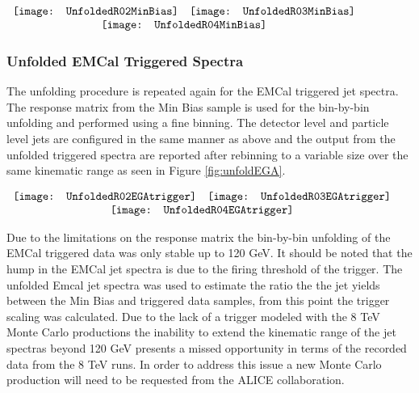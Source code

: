 \begin{figure*}[t!]
$\begin{array}{rl}
    \texttt{[image: UnfoldedR02MinBias]} &
    \texttt{[image: UnfoldedR03MinBias]}\\
    \multicolumn{2}{c}{\texttt{[image: UnfoldedR04MinBias]}}
\end{array}$
\caption[Corrected Jet Spectra to Monte Carlo level for R = 0.2, R=0.3, and R = 0.4 jets.]{\label{fig:unfoldMinbias}Unfolded Min Bias Jet Spectra with correction factors, $C_{MC}$, for R = 0.2, R=0.3, and R = 0.4 jets.}
\end{figure*}

\subsubsection{Unfolded EMCal Triggered Spectra}
The unfolding procedure is repeated again for the EMCal triggered jet spectra.  The response matrix from the Min Bias sample is used for the bin-by-bin unfolding and performed using a fine binning.  The detector level and particle level jets are configured in the same manner as above and the output from the unfolded triggered spectra are reported after rebinning to a variable size over the same kinematic range as seen in Figure \ref{fig:unfoldEGA}.

\begin{figure*}[t!]
$\begin{array}{rl}
    \texttt{[image: UnfoldedR02EGAtrigger]} &
    \texttt{[image: UnfoldedR03EGAtrigger]}\\
    \multicolumn{2}{c}{\texttt{[image: UnfoldedR04EGAtrigger]}}
\end{array}$
\caption[Corrected EMCal Triggered Jet Spectra to Monte Carlo level for R = 0.2, R=0.3, and R = 0.4 jets.]{\label{fig:unfoldEGA}Unfolded EMCal Triggered Jet Spectra with correction factors, $C_{MC}$, for R = 0.2, R=0.3, and R = 0.4 jets.}
\end{figure*}

\noindent
Due to the limitations on the response matrix the bin-by-bin unfolding of the EMCal triggered data was only stable up to 120 GeV.  It should be noted that the hump in the EMCal jet spectra is due to the firing threshold of the trigger.  The unfolded Emcal jet spectra was used to estimate the ratio the the jet yields between the Min Bias and triggered data samples, from this point the trigger scaling was calculated.  Due to the lack of a trigger modeled with the 8 TeV Monte Carlo productions the inability to extend the kinematic range of the jet spectras beyond 120 GeV presents a missed opportunity in terms of the recorded data from the 8 TeV runs.  In order to address this issue a new Monte Carlo production will need to be requested from the ALICE collaboration.

